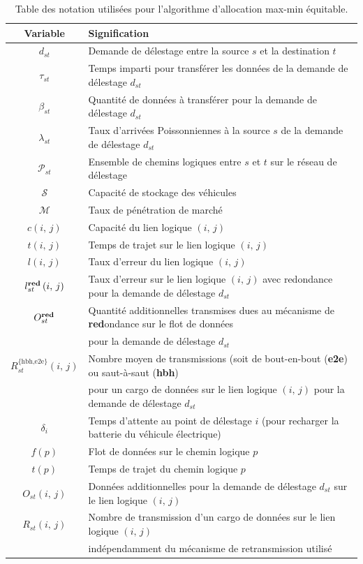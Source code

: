 
\begin{table}[ht] 
    \caption{Table des notation utilisées pour l’algorithme d’allocation max-min équitable.} 
    \renewcommand{\arraystretch}{1.1} 
    \centering 
    {\footnotesize 
    \begin{tabular}{c|l} 
        \textbf{Variable} & \textbf{Signification}\tabularnewline 
        \hline  
        $d_{st}$ & Demande de délestage entre la source $s$ et la destination $t$\tabularnewline 
        $\tau_{st}$ & Temps imparti pour transférer les données de la demande de délestage $d_{st}$\tabularnewline 
        $\beta_{st}$ & Quantité de données à transférer pour la demande de délestage $d_{st}$\tabularnewline 
        $\lambda_{st}$ & Taux d’arrivées Poissonniennes à la source $s$ de la demande de délestage $d_{st}$\tabularnewline 
        $\mathcal{P}_{st}$ & Ensemble de chemins logiques entre $s$ et $t$ sur le réseau de délestage\tabularnewline 
        $\mathcal{S}$ & Capacité de stockage des véhicules\tabularnewline 
        $\mathcal{M}$ & Taux de pénétration de marché\tabularnewline 
        $c\left(i,\, j\right)$ & Capacité du lien logique $\left(i,\, j\right)$\tabularnewline 
        $t\left(i,\, j\right)$ & Temps de trajet sur le lien logique $\left(i,\, j\right)$\tabularnewline 
        $l\left(i,\, j\right)$ & Taux d’erreur du lien logique $\left(i,\, j\right)$\tabularnewline 
        $l^{\textrm{\textbf{red}}}_{st}\left(i,\, j\right)$& Taux d’erreur sur le lien logique $\left(i,\, j\right)$ avec redondance pour la demande de délestage $d_{st}$\tabularnewline 
        $O^{\textrm{\textbf{red}}}_{st}$ & Quantité additionnelles transmises dues au mécanisme de \textbf{red}ondance sur le flot de données\\
         & pour la demande de délestage $d_{st}$\tabularnewline 
        $R^{\{\textrm{hbh,e2e}\}}_{st}(i,\,j)$ & Nombre moyen de transmissions (soit de bout-en-bout (\textbf{e2e}) ou saut-à-saut (\textbf{hbh}) \\ 
         & pour un cargo de données sur le lien logique $(i,\,j)$ pour la demande de délestage $d_{st}$\tabularnewline 
        $\delta_{i}$ & Temps d’attente au point de délestage $i$ (pour recharger la batterie du véhicule électrique)\tabularnewline 
        $f\left(p\right)$ & Flot de données sur le chemin logique $p$\tabularnewline 
        $t\left(p\right)$ &  Temps de trajet du chemin logique $p$\tabularnewline 
        $O_{st}(i,\,j)$ & Données additionnelles pour la demande de délestage $d_{st}$ sur le lien logique $(i,\,j)$\tabularnewline 
        $R_{st}(i,\,j)$ & Nombre de transmission d’un cargo de données sur le lien logique $(i,\,j)$ \\
         & indépendamment du mécanisme de retransmission utilisé\tabularnewline 
    \end{tabular}} 
    \label{tab:main-variables-haulage-fr} 
\end{table} 
 
